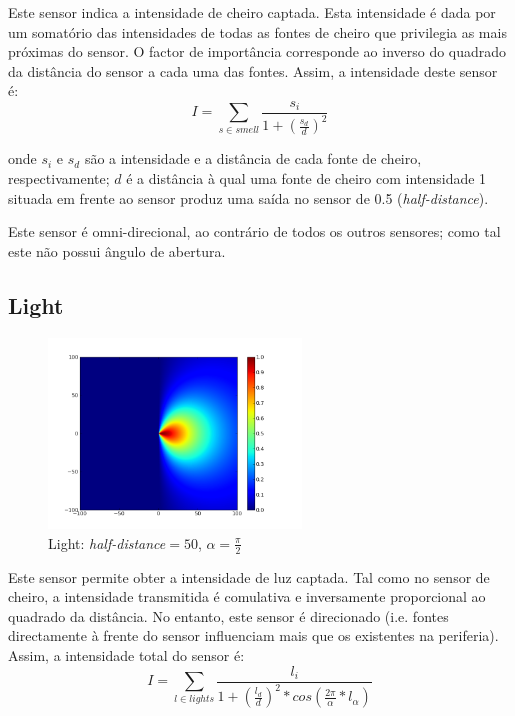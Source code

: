 \documentclass[a4paper]{article}
\begin{document}
\indent Este sensor indica a intensidade de cheiro captada. Esta intensidade é dada por um somatório das intensidades de todas as fontes de cheiro que privilegia as mais próximas do sensor. O factor de importância corresponde ao inverso do quadrado da distância do sensor a cada uma das fontes.
Assim, a intensidade deste sensor é:
\[
	I = \displaystyle\sum\limits_{s \in smell} \frac{s_{i}}{1 + (\frac{s_{d}}{d})^{2}}
\] 

onde $s_{i}$ e $s_{d}$ são a intensidade e a distância de cada fonte de cheiro, respectivamente; $d$ é a distância à qual uma fonte de cheiro com intensidade 1 situada em frente ao sensor produz uma saída no sensor de 0.5 (\emph{half-distance}).

Este sensor é omni-direcional, ao contrário de todos os outros sensores; como tal este não possui ângulo de abertura. 

\cleardoublepage
\subsection{Light}
\begin{figure}[h]
	\vspace{-20pt}
	\begin{center}
		\includegraphics[width=0.6\textwidth]{graphs/sensors/light.png}
	\end{center}
	\vspace{-20pt}
	\caption{Light: \emph{half-distance}$=50$, $\alpha=\frac{\pi}{2}$}
\end{figure}

\indent Este sensor permite obter a intensidade de luz captada. Tal como no sensor de cheiro, a intensidade transmitida
é comulativa e inversamente proporcional ao quadrado da distância. No entanto, este sensor é direcionado (i.e. fontes
directamente à frente do sensor influenciam mais que os existentes na periferia). Assim, a intensidade total do sensor é:
\[
	I = \displaystyle\sum\limits_{l \in lights} \frac{l_{i}}{1 + (\frac{l_{d}}{d})^{2}*cos(\frac{2\pi}{\alpha}*l_{\alpha})}
\]
\end{document}
